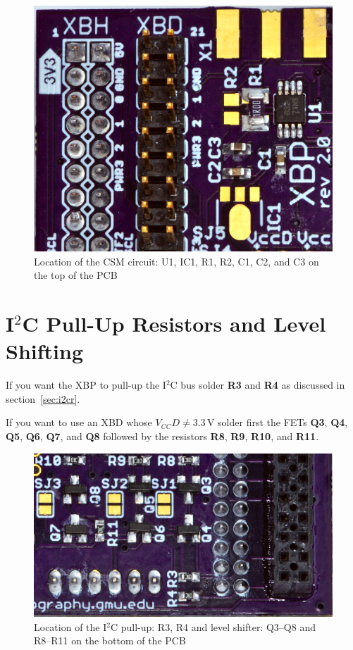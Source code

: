 \documentclass[twoside,11pt]{cergdoc}
\begin{document}
\begin{figure}[ht]
  \begin{center}
    \includegraphics[scale=0.8]{figures/xbp-ina225}
    \caption{Location of the CSM circuit: U1, IC1, R1, R2, C1, C2, and C3 on the top of the PCB}
  \end{center}
\end{figure}

\section{I$^2$C Pull-Up Resistors and Level Shifting}

If you want the XBP to pull-up the I$^2$C bus solder \textbf{R3} and \textbf{R4}
as discussed in section~\ref{sec:i2cr}. 

If you want to use an XBD whose $V_{CC}D \ne 3.3\,\mathrm{V}$ solder first the
FETs \textbf{Q3}, \textbf{Q4}, \textbf{Q5}, \textbf{Q6}, \textbf{Q7}, and \textbf{Q8}
followed by the resistors \textbf{R8}, \textbf{R9}, \textbf{R10}, and \textbf{R11}.

\begin{figure}[ht]
  \begin{center}
    \includegraphics[scale=1]{figures/xbp-i2c-circuit}
    \caption{Location of the I$^2$C pull-up: R3, R4 and level shifter: Q3--Q8 and R8--R11 on the bottom of the PCB}
  \end{center}
\end{figure}
\end{document}
